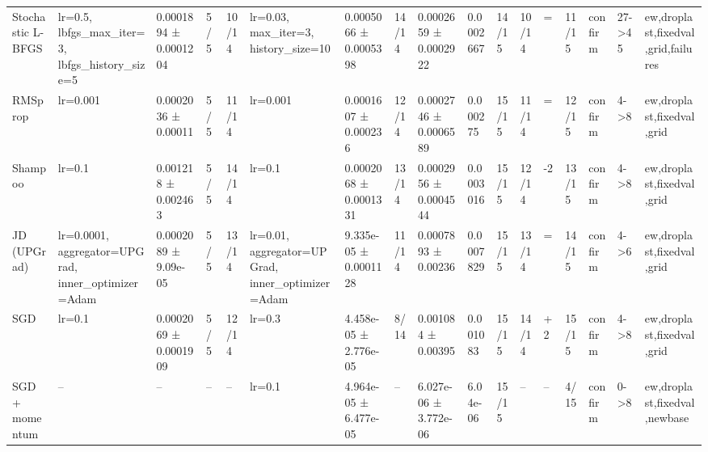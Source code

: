 \begin{tabular}{lllllllllllllllll}
Stochastic L-BFGS & lr=0.5, lbfgs\_max\_iter=3, lbfgs\_history\_size=5 & 0.0001894 ± 0.0001204 & 5/5 & 10/14 & lr=0.03, max\_iter=3, history\_size=10 & 0.0005066 ± 0.0005398 & 14/14 & 0.0002659 ± 0.0002922 & 0.0002667 & 14/15 & 10/14 & = & 11/15 & confirm & 27->45 & ew,droplast,fixedval,grid,failures \\
RMSprop & lr=0.001 & 0.0002036 ± 0.00011 & 5/5 & 11/14 & lr=0.001 & 0.0001607 ± 0.000236 & 12/14 & 0.0002746 ± 0.0006589 & 0.000275 & 15/15 & 11/14 & = & 12/15 & confirm & 4->8 & ew,droplast,fixedval,grid \\
Shampoo & lr=0.1 & 0.001218 ± 0.002463 & 5/5 & 14/14 & lr=0.1 & 0.0002068 ± 0.0001331 & 13/14 & 0.0002956 ± 0.0004544 & 0.0003016 & 15/15 & 12/14 & -2 & 13/15 & confirm & 4->8 & ew,droplast,fixedval,grid \\
JD (UPGrad) & lr=0.0001, aggregator=UPGrad, inner\_optimizer=Adam & 0.0002089 ± 9.09e-05 & 5/5 & 13/14 & lr=0.01, aggregator=UPGrad, inner\_optimizer=Adam & 9.335e-05 ± 0.0001128 & 11/14 & 0.0007893 ± 0.00236 & 0.0007829 & 15/15 & 13/14 & = & 14/15 & confirm & 4->6 & ew,droplast,fixedval,grid \\
SGD & lr=0.1 & 0.0002069 ± 0.0001909 & 5/5 & 12/14 & lr=0.3 & 4.458e-05 ± 2.776e-05 & 8/14 & 0.001084 ± 0.00395 & 0.001083 & 15/15 & 14/14 & +2 & 15/15 & confirm & 4->8 & ew,droplast,fixedval,grid \\
SGD + momentum & -- & -- & -- & -- & lr=0.1 & 4.964e-05 ± 6.477e-05 & -- & 6.027e-06 ± 3.772e-06 & 6.04e-06 & 15/15 & -- & -- & 4/15 & confirm & 0->8 & ew,droplast,fixedval,newbase \\
\bottomrule
\end{tabular}
